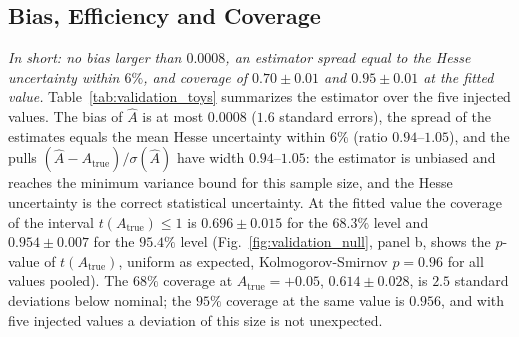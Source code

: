 \subsection{Bias, Efficiency and Coverage}
\label{sec:validation_estimator}
\emph{In short: no bias larger than $0.0008$, an estimator spread equal to the Hesse uncertainty within $6\%$, and coverage of $0.70\pm0.01$ and $0.95\pm0.01$ at the fitted value.}
Table~\ref{tab:validation_toys} summarizes the estimator over the five injected values. The bias of $\hat A$ is at most $0.0008$ ($1.6$ standard errors), the spread of the estimates equals the mean Hesse uncertainty within $6\%$ (ratio $0.94$--$1.05$), and the pulls $(\hat A-A_{\mathrm{true}})/\sigma(\hat A)$ have width $0.94$--$1.05$: the estimator is unbiased and reaches the minimum variance bound for this sample size, and the Hesse uncertainty is the correct statistical uncertainty. At the fitted value the coverage of the interval $t(A_{\mathrm{true}})\leq1$ is $0.696\pm0.015$ for the $68.3\%$ level and $0.954\pm0.007$ for the $95.4\%$ level (Fig.~\ref{fig:validation_null}, panel b, shows the $p$-value of $t(A_{\mathrm{true}})$, uniform as expected, Kolmogorov-Smirnov $p=0.96$ for all values pooled). The $68\%$ coverage at $A_{\mathrm{true}}=+0.05$, $0.614\pm0.028$, is $2.5$ standard deviations below nominal; the $95\%$ coverage at the same value is $0.956$, and with five injected values a deviation of this size is not unexpected.

\begin{table}[h]
\centering
{}
\caption{Pseudo-experiments at five injected values of the asymmetry: number of valid fits, bias of $\hat A$ with its standard error, spread of the estimates relative to the mean Hesse uncertainty ($0.0085$), and coverage of the intervals $t(A_{\mathrm{true}})\leq1$ and $\leq3.84$.}
\label{tab:validation_toys}
\end{table}


